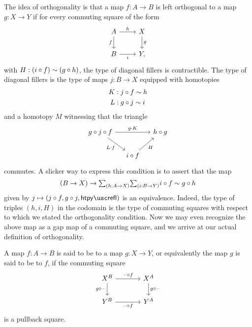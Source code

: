 The idea of orthogonality is that a map $f:A\to B$ is left orthogonal to a map $g:X\to Y$ if for every commuting square of the form
\begin{equation*}
  \begin{tikzcd}
    A \arrow[d,swap,"f"] \arrow[r,"h"] & X \arrow[d,"g"] \\
    B \arrow[r,swap,"i"] & Y,
  \end{tikzcd}
\end{equation*}
with $H:(i\circ f)\sim (g\circ h)$, the type of diagonal fillers is contractible. The type of diagonal fillers is the type of maps $j:B\to X$ equipped with homotopies
\begin{align*}
  K & : j\circ f\sim h \\
  L & : g\circ j\sim i
\end{align*}
and a homotopy $M$ witnessing that the triangle
\begin{equation*}
  \begin{tikzcd}[column sep=small]
    g\circ j\circ f \arrow[rr,"g\cdot K"] \arrow[dr,swap,"L\cdot f"] & & h\circ g \\
    & i\circ f \arrow[ur,swap,"H"]
  \end{tikzcd}
\end{equation*}
commutes. A slicker way to express this condition is to assert that the map
\begin{equation*}
   (B\to X)\to \sm{h:A\to X}{i:B\to Y} i\circ f\htpy g\circ h
\end{equation*}
given by $j\mapsto(j\circ f,g\circ j,\htpyrefl)$ is an equivalence. Indeed, the type of triples $(h,i,H)$ in the codomain is the type of commuting squares with respect to which we stated the orthogonality condition. Now we may even recognize the above map as a gap map of a commuting square, and we arrive at our actual definition of orthogonality.

\begin{defn}
  A map $f:A\to B$ is said to be  to a map $g:X\to Y$, or equivalently the map $g$ is said to be  to $f$, if the commuting square
  \begin{equation*}
    \begin{tikzcd}[column sep=large]
      X^B \arrow[r,"\blank\circ f"] \arrow[d,swap,"g\circ\blank"] & X^A \arrow[d,"g\circ\blank"] \\
      Y^B \arrow[r,swap,"\blank\circ f"] & Y^A
    \end{tikzcd}
  \end{equation*}
  is a pullback square.
\end{defn}

